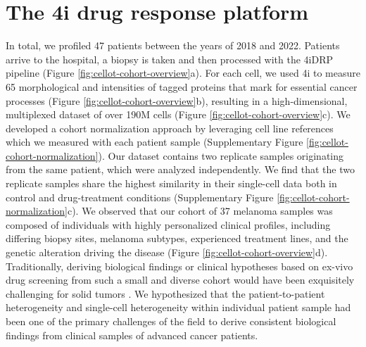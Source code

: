 \section{The 4i drug response platform}
In total, we profiled 47 patients between the years of 2018 and 2022.
Patients arrive to the hospital, a biopsy is taken and then processed with the 4iDRP pipeline (Figure \ref{fig:cellot-cohort-overview}a).
For each cell, we used 4i to measure 65 morphological and intensities of tagged proteins that mark for essential cancer processes (Figure \ref{fig:cellot-cohort-overview}b), resulting in a high-dimensional, multiplexed dataset of over 190M cells (Figure \ref{fig:cellot-cohort-overview}c).
We developed a cohort normalization approach by leveraging cell line references which we measured with each patient sample (Supplementary Figure \ref{fig:cellot-cohort-normalization}).
Our dataset contains two replicate samples originating from the same patient, which were analyzed independently.
We find that the two replicate samples share the highest similarity in their single-cell data both in control and drug-treatment conditions (Supplementary Figure \ref{fig:cellot-cohort-normalization}c).
We observed that our cohort of 37 melanoma samples was composed of individuals with highly personalized clinical profiles, including differing biopsy sites, melanoma subtypes, experienced treatment lines, and the genetic alteration driving the disease (Figure \ref{fig:cellot-cohort-overview}d). 
Traditionally, deriving biological findings or clinical hypotheses based on ex-vivo drug screening from such a small and diverse cohort would have been exquisitely challenging for solid tumors \cite{williams2022}.
We hypothesized that the patient-to-patient heterogeneity and single-cell heterogeneity within individual patient sample had been one of the primary challenges of the field to derive consistent biological findings from clinical samples of advanced cancer patients.

